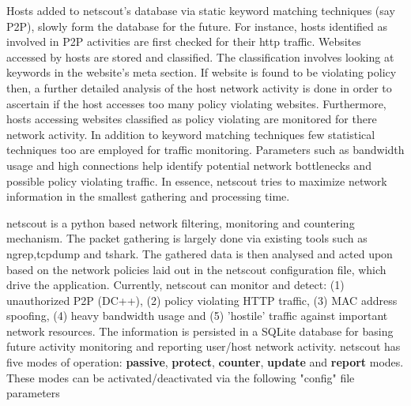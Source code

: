 \documentclass[twocolumn]{article}
\makeatletter
\def\section{\@startsection {section}{1}{\z@}{1.0ex plus 1ex minus .2ex}{.2ex plus .2ex}{\large\bf}}
\makeatother
\begin{document}
Hosts added to netscout's database via static keyword matching techniques (say P2P), slowly form the
database for the future. For instance, hosts identified as involved in P2P activities are first
checked for their http traffic. Websites accessed by hosts are stored and classified. The classification
involves looking at keywords in the website's meta section. If website is found to be
violating policy then, a further detailed analysis of the host network activity is done in order to 
ascertain if the host accesses too many policy violating websites. Furthermore, hosts accessing websites classified
as policy violating are monitored for there network activity. 
In addition to keyword matching techniques few statistical techniques too are employed for traffic monitoring.
Parameters such as bandwidth usage and high connections help identify potential network bottlenecks and
possible policy violating traffic.
In essence, netscout tries to maximize network information in the smallest gathering and processing time.

 
\section{netscout internals}
netscout is a python based network filtering, monitoring and countering mechanism. The 
packet gathering is largely done via existing tools such as ngrep\cite{ngrep},tcpdump\cite{tcpdump}
and tshark\cite{tshark}. The gathered data is then analysed and acted upon based on the network policies
laid out in the netscout configuration file, which drive the application. 
Currently, netscout can monitor and detect:  
(1) unauthorized  P2P (DC++), (2) policy violating HTTP traffic, (3) MAC address spoofing, 
(4) heavy bandwidth usage and (5) 'hostile' traffic against important network resources. 
The information is persisted in a SQLite database for basing future activity monitoring and 
reporting user/host network activity.
netscout has five modes of operation: {\bf passive}, {\bf protect}, {\bf counter}, {\bf update} and {\bf report} modes.
These modes can be activated/deactivated via the following "config" file parameters
\end{document}
